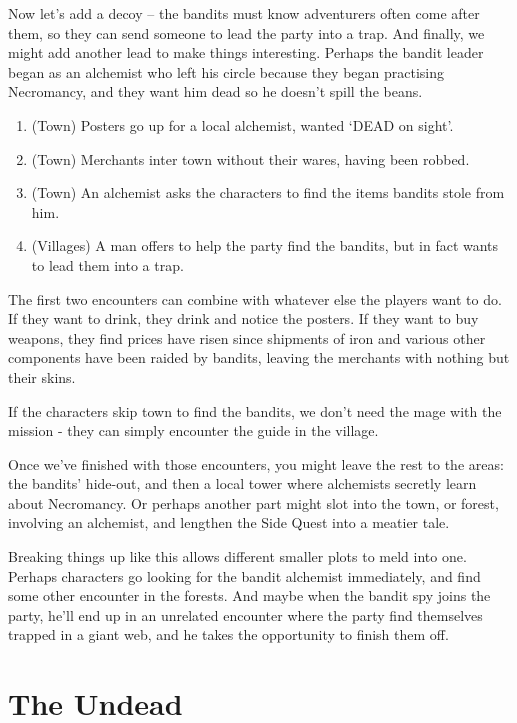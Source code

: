 \begin{multicols}{2}
Now let's add a decoy -- the bandits must know adventurers often come after them, so they can send someone to lead the party into a trap.
And finally, we might add another lead to make things interesting.
Perhaps the bandit leader began as an alchemist who left his circle because they began practising Necromancy, and they want him dead so he doesn't spill the beans.

\begin{enumerate}
	\item
	(Town)
	Posters go up for a local alchemist, wanted `DEAD on sight'.
	\item
	(Town) 
	Merchants inter town without their wares, having been robbed.
	\item
	(Town)
	An alchemist asks the characters to find the items bandits stole from him.
	\item
	(Villages)
	A man offers to help the party find the bandits, but in fact wants to lead them into a trap.
\end{enumerate}

The first two encounters can combine with whatever else the players want to do.
If they want to drink, they drink and notice the posters.
If they want to buy weapons, they find prices have risen since shipments of iron and various other components have been raided by bandits, leaving the merchants with nothing but their skins.

If the characters skip town to find the bandits, we don't need the mage with the mission - they can simply encounter the guide in the village.

Once we've finished with those encounters, you might leave the rest to the areas: the bandits' hide-out, and then a local tower where alchemists secretly learn about Necromancy.
Or perhaps another part might slot into the town, or forest, involving an alchemist, and lengthen the Side Quest into a meatier tale.

Breaking things up like this allows different smaller plots to meld into one.
Perhaps characters go looking for the bandit alchemist immediately, and find some other encounter in the forests.
And maybe when the bandit spy joins the party, he'll end up in an unrelated encounter where the party find themselves trapped in a giant web, and he takes the opportunity to finish them off.

\end{multicols}

\section{The Undead}

